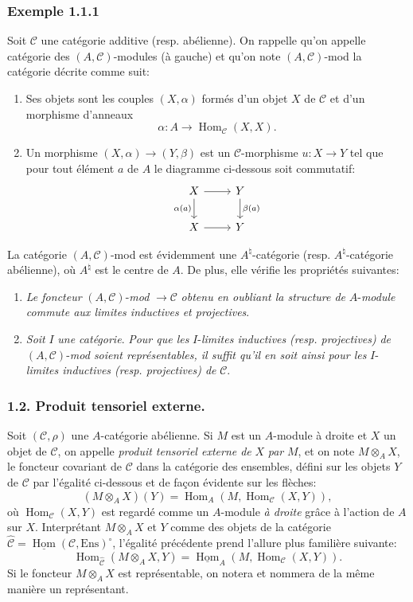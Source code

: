 \documentclass[11pt]{article}
\DeclareMathOperator{\Hom}{Hom}
\providecommand{\uHom}{\underline{\Hom}}
\providecommand{\Hom}{\operatorname{Hom}}
\providecommand{\Ens}{\mathrm{Ens}}
\providecommand{\cC}{\mathcal C}
\providecommand{\Ens}{\operatorname{Ens}}
\providecommand{\cC}{\mathcal C}
\providecommand{\Hom}{\operatorname{Hom}}
\begin{document}
\subsubsection*{Exemple 1.1.1}
Soit $\cC$ une catégorie additive (resp. abélienne). On rappelle qu'on appelle catégorie des $(A,\cC)$-modules (à gauche) et qu'on note $(A,\cC)$-mod la catégorie décrite comme suit:
\begin{enumerate}[label=(\roman*)]
\item Ses
objets sont les couples $(X,\alpha)$ formés d'un objet $X$ de $\cC$ et d'un morphisme d'anneaux
\[
\alpha:A\longrightarrow \Hom_{\cC}(X,X).
\]
\item Un morphisme $(X,\alpha)\to(Y,\beta)$ est un $\cC$-morphisme $u:X\to Y$ tel que pour tout élément $a$ de $A$ le diagramme ci-dessous soit commutatif:
\[
\begin{tikzcd}
X \arrow[r] \arrow[d,"\alpha(a)"'] & Y \arrow[d,"\beta(a)"]\\
X \arrow[r] & Y
\end{tikzcd}
\]
\end{enumerate}
La catégorie $(A,\cC)$-mod est évidemment une $A^{\natural}$-catégorie (resp. $A^{\natural}$-catégorie abélienne), où $A^{\natural}$ est le centre de $A$. De plus, elle vérifie les propriétés suivantes:
\begin{enumerate}[label=(\alph*)]
\item \emph{Le foncteur} $(A,\cC)$-\emph{mod} $\to\cC$ \emph{obtenu en oubliant la structure de} $A$-\emph{module commute aux limites inductives et projectives}.
\item \emph{Soit} $I$ \emph{une catégorie}. \emph{Pour que les} $I$-\emph{limites inductives} \emph{(resp. projectives)} \emph{de} $(A,\cC)$-\emph{mod soient représentables, il suffit qu'il en soit ainsi pour les} $I$-\emph{limites inductives (resp. projectives) de} $\cC$.
\end{enumerate}

\subsubsection*{1.2. Produit tensoriel externe.}
Soit $(\cC,\rho)$ une $A$-catégorie abélienne. Si $M$ est un $A$-module à droite et $X$ un objet de $\cC$, on appelle \emph{produit tensoriel externe de} $X$ \emph{par} $M$, et on note $M\otimes_A X$, le foncteur covariant de $\cC$ dans la catégorie des ensembles, défini sur les objets $Y$ de $\cC$ par l'égalité ci-dessous et de façon évidente sur les flèches:
\[
(M\otimes_A X)(Y)=\Hom_A(M,\Hom_{\cC}(X,Y)),
\]
où $\Hom_{\cC}(X,Y)$ est regardé comme un $A$-module \emph{à droite} grâce à l'action de $A$ sur $X$. Interprétant $M\otimes_AX$ et $Y$ comme des objets de la catégorie $\widehat{\cC}=\uHom(\cC,\Ens)^{\circ}$, l'égalité précédente prend l'allure plus familière
suivante:
\[
\Hom_{\widehat{\cC}}(M\otimes_A X,Y)=\uHom_A(M,\Hom_{\cC}(X,Y)).
\]
Si le foncteur $M\otimes_A X$ est représentable, on notera et nommera de la même manière un représentant.
\end{document}
